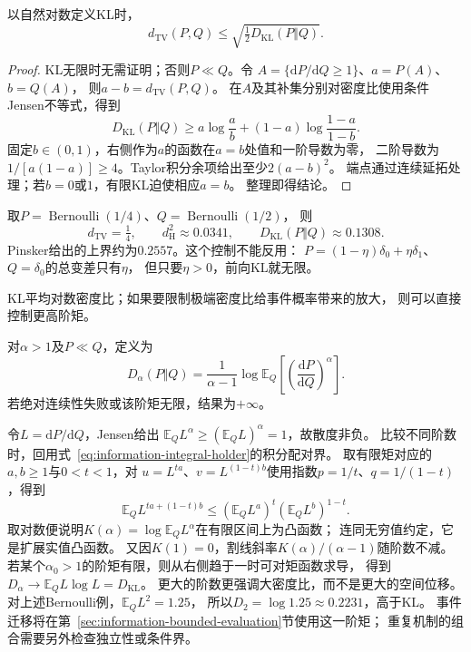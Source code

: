 \begin{theorem}[Pinsker不等式]
\label{thm:information-pinsker}
以自然对数定义KL时，
\begin{equation}
  d_{\mathrm{TV}}(P,Q)\leq
  \sqrt{\tfrac12D_{\mathrm{KL}}(P\Vert Q)}.
  \label{eq:information-pinsker}
\end{equation}
\end{theorem}
\begin{proof}
KL无限时无需证明；否则\(P\ll Q\)。令
\(A=\{\mathrm dP/\mathrm dQ\geq1\}\)、\(a=P(A)\)、\(b=Q(A)\)，
则\(a-b=d_{\mathrm{TV}}(P,Q)\)。
在\(A\)及其补集分别对密度比使用条件Jensen不等式，得到
\[
  D_{\mathrm{KL}}(P\Vert Q)\geq
  a\log\frac ab+(1-a)\log\frac{1-a}{1-b}.
\]
固定\(b\in(0,1)\)，右侧作为\(a\)的函数在\(a=b\)处值和一阶导数为零，
二阶导数为\(1/[a(1-a)]\geq4\)。Taylor积分余项给出至少\(2(a-b)^2\)。
端点通过连续延拓处理；若\(b=0\)或\(1\)，有限KL迫使相应\(a=b\)。
整理即得结论。
\end{proof}

取\(P=\operatorname{Bernoulli}(1/4)\)、\(Q=\operatorname{Bernoulli}(1/2)\)，
则
\[
  d_{\mathrm{TV}}=\tfrac14,\qquad
  d_{\mathrm H}^2\approx0.0341,\qquad
  D_{\mathrm{KL}}(P\Vert Q)\approx0.1308.
\]
Pinsker给出的上界约为\(0.2557\)。这个控制不能反用：
\(P=(1-\eta)\delta_0+\eta\delta_1\)、\(Q=\delta_0\)的总变差只有\(\eta\)，
但只要\(\eta>0\)，前向KL就无限。

KL平均对数密度比；如果要限制极端密度比给事件概率带来的放大，
则可以直接控制更高阶矩。

\begin{definition}[高于一阶的Rényi散度]
\label{def:information-renyi-divergence}
对\(\alpha>1\)及\(P\ll Q\)，定义为
\begin{equation}
  D_\alpha(P\Vert Q)
   =\frac1{\alpha-1}\log\mathbb E_Q
       \left[\left(\frac{\mathrm dP}{\mathrm dQ}\right)^\alpha\right].
  \label{eq:information-renyi-divergence}
\end{equation}
若绝对连续性失败或该阶矩无限，结果为\(+\infty\)。
\end{definition}

令\(L=\mathrm dP/\mathrm dQ\)，Jensen给出
\(\mathbb E_Q L^\alpha\geq(\mathbb E_QL)^\alpha=1\)，故散度非负。
比较不同阶数时，回用式~\eqref{eq:information-integral-holder}的积分配对界。
取有限矩对应的\(a,b\geq1\)与\(0<t<1\)，对
\(u=L^{ta}\)、\(v=L^{(1-t)b}\)使用指数\(p=1/t\)、\(q=1/(1-t)\)，得到
\[
 \mathbb E_Q L^{ta+(1-t)b}
 \leq(\mathbb E_Q L^a)^t(\mathbb E_Q L^b)^{1-t}.
\]
取对数便说明\(K(\alpha)=\log\mathbb E_QL^\alpha\)在有限区间上为凸函数；
连同无穷值约定，它是扩展实值凸函数。
又因\(K(1)=0\)，割线斜率\(K(\alpha)/(\alpha-1)\)随阶数不减。
若某个\(\alpha_0>1\)的阶矩有限，则从右侧趋于一时可对矩函数求导，
得到\(D_\alpha\to\mathbb E_Q L\log L=D_{\mathrm{KL}}\)。
更大的阶数更强调大密度比，而不是更大的空间位移。
对上述Bernoulli例，\(\mathbb E_QL^2=1.25\)，
所以\(D_2=\log1.25\approx0.2231\)，高于KL。
事件迁移将在第~\ref{sec:information-bounded-evaluation}节使用这一阶矩；
重复机制的组合需要另外检查独立性或条件界。

